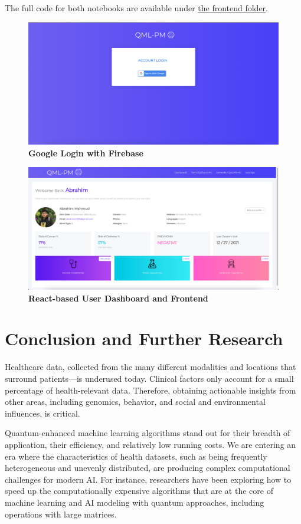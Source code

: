 \documentclass{scrartcl}
\begin{document}
The full code for both notebooks are available under \href{frontend/}{the frontend folder}.

\begin{figure}[htbp]
\centering
\includegraphics[width=.9\linewidth]{./assets/QML-PM_LOGIN.png}
\caption{\textbf{Google Login with Firebase}}
\end{figure}

\begin{figure}[htbp]
\centering
\includegraphics[width=.9\linewidth]{./assets/QML-PM_DASHBOARD.png}
\caption{\textbf{React-based User Dashboard and Frontend}}
\end{figure}

\section{Conclusion and Further Research}
\label{sec:orga131217}

Healthcare data, collected from the many different modalities and locations that surround patients—is underused today. Clinical factors only account for a small percentage of health-relevant data. Therefore, obtaining actionable insights from other areas, including genomics, behavior, and social and environmental influences, is critical.

Quantum-enhanced machine learning algorithms stand out for their breadth of application, their efficiency, and relatively low running costs. We are entering an era where the characteristics of health datasets, such as being frequently heterogeneous and unevenly distributed, are producing complex computational challenges for modern AI. For instance, researchers have been exploring how to speed up the computationally expensive algorithms that are at the core of machine learning and AI modeling with quantum approaches, including operations with large matrices.
\end{document}
